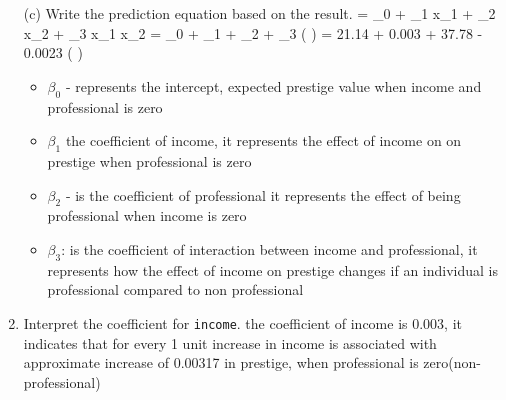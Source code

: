 \documentclass[12pt,letterpaper]{article}
\begin{document}
\begin{enumerate}
	\vspace{0.6cm}
	\item [(c)]
	Write the prediction equation based on the result.
	\newline
	 = \beta_0 + \beta_1 x_1 + \beta_2 x_2 + \beta_3 x_1 x_2
	\vspace{0.2cm}
	\newline
	 = \beta_0 + \beta_1 \times {} + \beta_2 \times {} + \beta_3 \times ( \times {})
	\vspace{0.2cm}
	\newline
	 = 21.14 + 0.003 \times {} + 37.78 \times {} - 0.0023 \times ( \times {})
	\begin{itemize}
		\item $\beta_0$ - represents the intercept, expected prestige value when income and professional is zero
		\item $\beta_1$ the coefficient of income, it represents the effect of income on on prestige when professional is zero
		\item $\beta_2$ - is the coefficient of professional it represents the effect of being professional when income is zero
		\item $\beta_3$: is the coefficient of interaction between income and professional, it represents how the effect of income on prestige changes if an individual is professional compared to non professional
		
	\end{itemize}
\newpage
	\item \text{[(d)]}
	Interpret the coefficient for \texttt{income}.
	\vspace{0.2cm}
	\newline
	the coefficient of income is 0.003, it indicates that for every 1 unit increase in income is associated with approximate increase of 0.00317 in prestige, when professional is zero(non- professional)
	

\end{enumerate}
\end{document}
